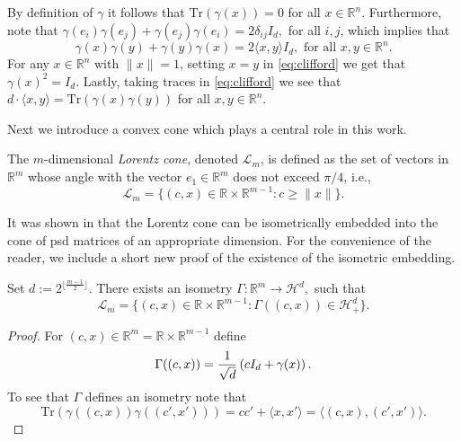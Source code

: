 \documentclass{siamart}
\begin{document}
{{By definition of $\gamma$ it follows that ${\mathrm{Tr}}(\gamma(x))=0$ for all
$x\in {\mathbb{R}}^n$. Furthermore, note  that
$\gamma(e_i)\gamma(e_j)+\gamma(e_j)\gamma(e_i)=2\delta_{ij}I_d, $
for all $i,j$, which implies that \begin{equation}\label{eq:clifford}
\gamma(x)\gamma(y)+\gamma(y)\gamma(x)=2{\langle} x,y{\rangle} I_d, \text{ for
all } x,y\in {\mathbb{R}}^n. \end{equation} For any $x\in {\mathbb{R}}^n$ with ${\|x\|=1}$, setting
$x=y$ in \eqref{eq:clifford} we get that $\gamma(x)^2=I_d$. Lastly,
taking traces in \eqref{eq:clifford} we see that ${d\cdot{\langle}
x,y{\rangle}}={\mathrm{Tr}}\left( \gamma(x)\gamma(y)\right)$ for all $x,y\in {\mathbb{R}}^n$.

Next we introduce a convex cone which plays a central role in this work.
\medskip
\begin{definition}The {$m$-dimensional} {\em Lorentz cone}, denoted ${\mathcal{L}}_m$, is defined as the set of vectors in $ {\mathbb{R}}^m$ whose angle with the vector $e_1\in {\mathbb{R}}^m$ does not exceed $\pi/4$, i.e.,
\[ {\mathcal{L}}_m=\big \{(c,x)\in {\mathbb{R}}\times  {\mathbb{R}}^{m-1}: c\ge \|x\|\}.\]
\end{definition}

It was shown  in \cite{FW}  that the Lorentz cone can be
isometrically embedded into the cone of psd  matrices of an
appropriate dimension. For the convenience of the reader, we
include a short new proof of the existence of the isometric embedding.

\medskip 

\begin{theorem}[\cite{FW}]\label{thm:isometry} Set $d:= {2^{\lfloor \frac{m-1}{2} \rfloor}}$.
There exists {an} isometry $\Gamma: {\mathbb{R}}^m \rightarrow {\mathcal{H}}^d,$  such that
 $${\mathcal{L}}_m=\{(c,x)\in {{\mathbb{R}} \times {\mathbb{R}}^{m-1}}: {\Gamma((c,x))} \in {\mathcal{H}}^d_+\}.$$
\end{theorem}

\begin{proof}
For $(c,x)\in {\mathbb{R}}^m={\mathbb{R}}\times  {\mathbb{R}}^{m-1}$ define
\begin{equation}\label{eq:isometry}
{\Gamma((c,x))}={1\over \sqrt{d}}\left(cI_d+\gamma(x)\right).
\end{equation}
To see that $\Gamma$ defines  an isometry note that
\[
{
{\mathrm{Tr}} ( \gamma((c,x)) \gamma((c',x')))
=
cc' + {\langle {x}, {x'} \rangle}
=
{\langle {(c,x)}, {(c',x')} \rangle}.
}
\]


\end{proof}}}
\end{document}

